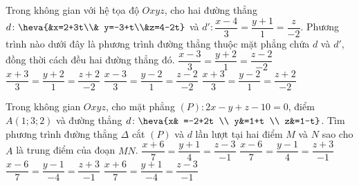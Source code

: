 \begin{ex}%
	Trong không gian với hệ tọa độ $Oxyz$, cho hai đường thẳng $d\colon \heva{&x=2+3t\\& y=-3+t\\&z=4-2t}$ và $d'\colon \dfrac{x-4}{3}=\dfrac{y+1}{1}=\dfrac{z}{-2}$. Phương trình nào dưới đây là phương trình đường thẳng thuộc mặt phẳng chứa $d$ và $d'$, đồng thời cách đều hai đường thẳng đó.
	\choice
	{\True  $\dfrac{x-3}{3}=\dfrac{y+2}{1}=\dfrac{z-2}{-2}$}
	{$\dfrac{x+3}{3}=\dfrac{y+2}{1}=\dfrac{z+2}{-2}$}
	{$\dfrac{x-3}{3}=\dfrac{y-2}{1}=\dfrac{z-2}{-2}$}
	{$\dfrac{x+3}{3}=\dfrac{y-2}{1}=\dfrac{z+2}{-2}$}
\end{ex}
\begin{ex}%
	Trong không gian $Oxyz$, cho mặt phẳng $\left(P\right) \colon 2x-y+z-10=0$, điểm $A\left(1 ; 3 ; 2\right)$ và đường thẳng $d \colon \heva{x& =-2+2t \\ y&=1+t \\ z&=1-t}$. Tìm phương trình đường thẳng $\Delta $ cắt $\left(P\right)$ và $d$ lần lượt tại hai điểm $M$ và $N$ sao cho $A$ là trung điểm của đoạn $MN$. 
	\choice 
	{\True $\dfrac{x+6}{7} =\dfrac{y+1}{4} =\dfrac{z-3}{-1} $}
	{$\dfrac{x-6}{7} =\dfrac{y-1}{4} =\dfrac{z+3}{-1} $}
	{$\dfrac{x-6}{7} =\dfrac{y-1}{-4} =\dfrac{z+3}{-1} $}
	{$\dfrac{x+6}{7} =\dfrac{y+1}{-4} =\dfrac{z-3}{-1} $} 
\end{ex} 
